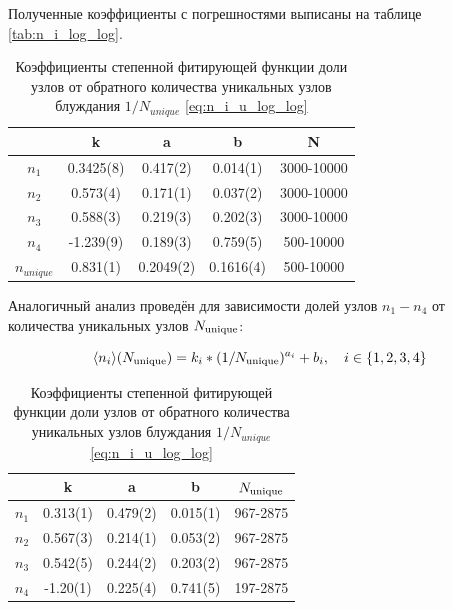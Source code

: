 Полученные коэффициенты с погрешностями выписаны на таблице \ref{tab:n_i_log_log}.

\begin{table}[h]
\centering
\begin{tabular}{|c|c|c|c|c|}
\hline
 & k & a & b & N \\ \hline
$n_1$ & 0.3425(8) & 0.417(2) & 0.014(1) & 3000-10000 \\ \hline
$n_2$ & 0.573(4) & 0.171(1) & 0.037(2) & 3000-10000 \\ \hline
$n_3$ & 0.588(3) & 0.219(3) & 0.202(3) & 3000-10000 \\ \hline
$n_4$ & -1.239(9) & 0.189(3) & 0.759(5) & 500-10000 \\ \hline
$n_{unique}$ & 0.831(1) & 0.2049(2) & 0.1616(4) & 500-10000 \\ \hline
\end{tabular}
\caption{Коэффициенты степенной фитирующей функции доли узлов от обратного количества шагов блуждания $1/N$ \ref{eq:n_i_log_log}}
\label{tab:n_i_log_log}

Аналогичный анализ проведён для зависимости долей узлов $n_1 - n_4$ от количества уникальных узлов $N_{\textup{unique}}$:

\begin{equation}
\langle n_{i} \rangle (N_{\textup{unique}}) = k_i * (1/N_{\textup{unique}})^{a_i} + b_i,\ \ \ i \in \{1,2,3,4\}
\label{eq:n_i_u_log_log}
\end{equation}

\begin{tabular}{|c|c|c|c|c|}
\hline
 & k & a & b & $N_{\textup{unique}}$ \\ \hline
$n_1$ & 0.313(1) & 0.479(2) & 0.015(1) & 967-2875 \\ \hline
$n_2$ & 0.567(3) & 0.214(1) & 0.053(2) & 967-2875 \\ \hline
$n_3$  & 0.542(5) & 0.244(2) & 0.203(2) & 967-2875 \\ \hline
$n_4$ & -1.20(1) & 0.225(4) & 0.741(5) & 197-2875 \\ \hline
\end{tabular} 
\caption{Коэффициенты степенной фитирующей функции доли узлов от обратного количества уникальных узлов блуждания $1/N_{unique}$ \ref{eq:n_i_u_log_log}}
\label{tab:n_i_u_log_log}
\end{table}

